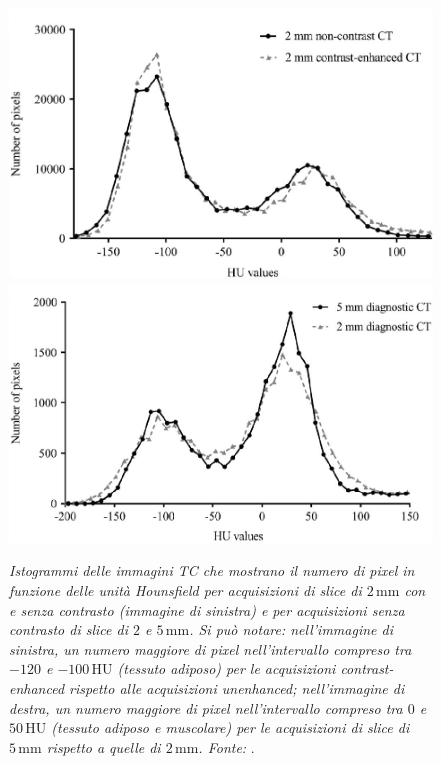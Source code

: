 \begin{figure}[htp]
\centering
\includegraphics[scale=0.65]{Immagini/fuchs_contrasto2.png}\quad\includegraphics[scale=0.65]{Immagini/fuchs_spessore2.png}
\caption{\label{fig:fuchs_2} \textit{Istogrammi delle immagini TC che mostrano il numero di pixel in funzione delle unità Hounsfield per acquisizioni di slice di $2\,\mathrm{mm}$ con e senza contrasto (immagine di sinistra) e per acquisizioni senza contrasto di slice di $2$ e $5\,\mathrm{mm}$. Si può notare: nell'immagine di sinistra, un numero maggiore di pixel nell'intervallo compreso tra $-120$ e $-100\,\mathrm{HU}$ (tessuto adiposo) per le acquisizioni contrast-enhanced rispetto alle acquisizioni unenhanced; nell'immagine di destra, un numero maggiore di pixel nell'intervallo compreso tra $0$ e $50\,\mathrm{HU}$ (tessuto adiposo e muscolare) per le acquisizioni di slice di $5\,\mathrm{mm}$ rispetto a quelle di $2\,\mathrm{mm}$. Fonte:} \cite{Fuchs2018}.}
\end{figure}

